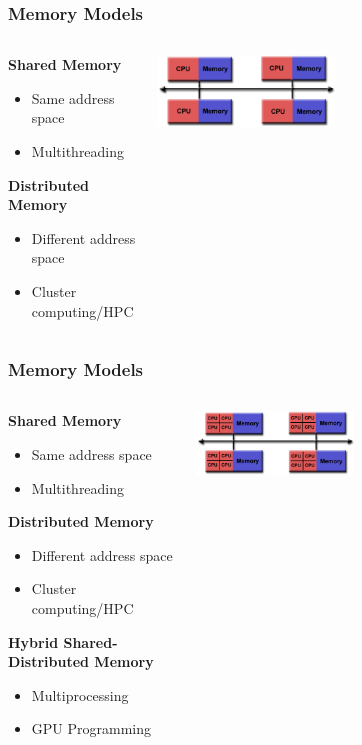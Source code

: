 \documentclass{beamer}
\begin{document}
\begin{frame}
\frametitle{Memory Models}
\begin{columns}
\begin{column}{.4\textwidth}
\textbf{Shared Memory}
\begin{itemize}
  \item Same address space
  \item Multithreading
\end{itemize}

\textbf{Distributed Memory}
\begin{itemize}
  \item Different address space
  \item Cluster computing/HPC
\end{itemize}
\end{column}

\begin{column}{.6\textwidth}
\includegraphics[width=0.5\textwidth]{img/distributed_mem.png} 
\end{column}
\end{columns}
\end{frame}

\begin{frame}
\frametitle{Memory Models}
\begin{columns}
\begin{column}{.4\textwidth}
\textbf{Shared Memory}
\begin{itemize}
  \item Same address space
  \item Multithreading
\end{itemize}

\textbf{Distributed Memory}
\begin{itemize}
  \item Different address space
  \item Cluster computing/HPC
\end{itemize}

\textbf{Hybrid Shared-Distributed Memory}
\begin{itemize}
  \item Multiprocessing
  \item GPU Programming
\end{itemize}
\end{column}

\begin{column}{.6\textwidth}
\includegraphics[width=0.5\textwidth]{img/hybrid_mem.png} 
\end{column}
\end{columns}
\end{frame}
\end{document}

